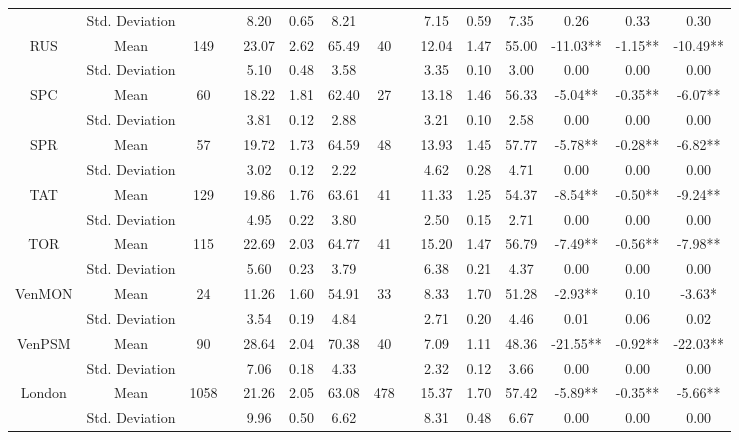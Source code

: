 \begin{table}
{\begin{tabular}{cc|cccc|cccc|ccc}
 & Std. Deviation &  & 8.20 & 0.65 & 8.21 &  & 7.15 & 0.59 & 7.35 & 0.26 & 0.33 & 0.30 \\
RUS & Mean & \multirow{2}{*}{149 ~} & 23.07 & 2.62 & 65.49 & \multirow{2}{*}{40 ~} & 12.04 & 1.47 & 55.00 & -11.03** & -1.15** & -10.49** \\
 & Std. Deviation &  & 5.10 & 0.48 & 3.58 &  & 3.35 & 0.10 & 3.00 & 0.00 & 0.00 & 0.00 \\
SPC & Mean & \multirow{2}{*}{60 ~} & 18.22 & 1.81 & 62.40 & \multirow{2}{*}{27 ~} & 13.18 & 1.46 & 56.33 & -5.04** & -0.35** & -6.07** \\
 & Std. Deviation &  & 3.81 & 0.12 & 2.88 &  & 3.21 & 0.10 & 2.58 & 0.00 & 0.00 & 0.00 \\
SPR & Mean & \multirow{2}{*}{57 ~} & 19.72 & 1.73 & 64.59 & \multirow{2}{*}{48 ~} & 13.93 & 1.45 & 57.77 & -5.78** & -0.28** & -6.82** \\
 & Std. Deviation &  & 3.02 & 0.12 & 2.22 &  & 4.62 & 0.28 & 4.71 & 0.00 & 0.00 & 0.00 \\
TAT & Mean & \multirow{2}{*}{129 ~} & 19.86 & 1.76 & 63.61 & \multirow{2}{*}{41 ~} & 11.33 & 1.25 & 54.37 & -8.54** & -0.50** & -9.24** \\
 & Std. Deviation &  & 4.95 & 0.22 & 3.80 &  & 2.50 & 0.15 & 2.71 & 0.00 & 0.00 & 0.00 \\
TOR & Mean & \multirow{2}{*}{115 ~} & 22.69 & 2.03 & 64.77 & \multirow{2}{*}{41 ~} & 15.20 & 1.47 & 56.79 & -7.49** & -0.56** & -7.98** \\
 & Std. Deviation &  & 5.60 & 0.23 & 3.79 &  & 6.38 & 0.21 & 4.37 & 0.00 & 0.00 & 0.00 \\
VenMON & Mean & \multirow{2}{*}{24 ~} & 11.26 & 1.60 & 54.91 & \multirow{2}{*}{33 ~} & 8.33 & 1.70 & 51.28 & -2.93** & 0.10 & -3.63* \\
 & Std. Deviation &  & 3.54 & 0.19 & 4.84 &  & 2.71 & 0.20 & 4.46 & 0.01 & 0.06 & 0.02 \\
VenPSM & Mean & \multirow{2}{*}{90 ~} & 28.64 & 2.04 & 70.38 & \multirow{2}{*}{40 ~} & 7.09 & 1.11 & 48.36 & -21.55** & -0.92** & -22.03** \\
 & Std. Deviation &  & 7.06 & 0.18 & 4.33 &  & 2.32 & 0.12 & 3.66 & 0.00 & 0.00 & 0.00 \\ 
\hline
London & Mean & \multirow{2}{*}{1058 ~} & 21.26 & 2.05 & 63.08 & \multirow{2}{*}{478 ~} & 15.37 & 1.70 & 57.42 & -5.89** & -0.35** & -5.66** \\
~ & Std.  Deviation &  & 9.96 & 0.50 & 6.62 &  & 8.31 & 0.48 & 6.67 & 0.00 & 0.00 & 0.00 \\

\end{tabular}}
\end{table}
